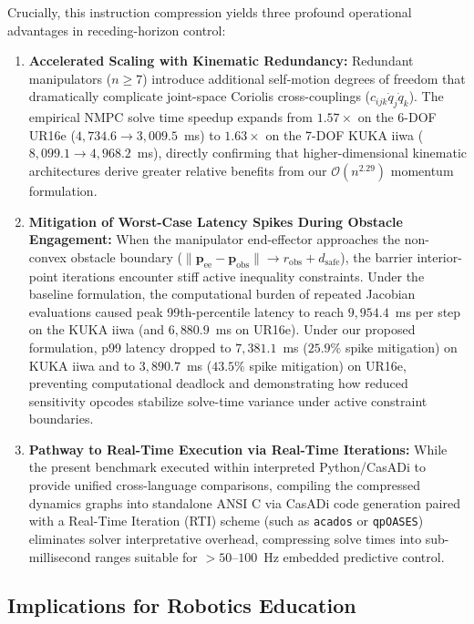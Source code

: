 \documentclass[fleqn,10pt]{article}
\begin{document}
Crucially, this instruction compression yields three profound operational advantages in receding-horizon control:
\begin{enumerate}
	\item \textbf{Accelerated Scaling with Kinematic Redundancy:} Redundant manipulators ($n \ge 7$) introduce additional self-motion degrees of freedom that dramatically complicate joint-space Coriolis cross-couplings ($c_{ijk}\dot{q}_j\dot{q}_k$). The empirical NMPC solve time speedup expands from $1.57\times$ on the 6-DOF UR16e ($4,734.6 \to 3,009.5$~ms) to $1.63\times$ on the 7-DOF KUKA iiwa ($8,099.1 \to 4,968.2$~ms), directly confirming that higher-dimensional kinematic architectures derive greater relative benefits from our $\mathcal{O}(n^{2.29})$ momentum formulation.
	\item \textbf{Mitigation of Worst-Case Latency Spikes During Obstacle Engagement:} When the manipulator end-effector approaches the non-convex obstacle boundary ($\|\bm{p}_{\text{ee}} - \bm{p}_{\text{obs}}\| \to r_{\text{obs}} + d_{\text{safe}}$), the barrier interior-point iterations encounter stiff active inequality constraints. Under the baseline formulation, the computational burden of repeated Jacobian evaluations caused peak 99th-percentile latency to reach $9,954.4$~ms per step on the KUKA iiwa (and $6,880.9$~ms on UR16e). Under our proposed formulation, p99 latency dropped to $7,381.1$~ms ($25.9\%$ spike mitigation) on KUKA iiwa and to $3,890.7$~ms ($43.5\%$ spike mitigation) on UR16e, preventing computational deadlock and demonstrating how reduced sensitivity opcodes stabilize solve-time variance under active constraint boundaries.
	\item \textbf{Pathway to Real-Time Execution via Real-Time Iterations:} While the present benchmark executed within interpreted Python/CasADi to provide unified cross-language comparisons, compiling the compressed dynamics graphs into standalone ANSI C via CasADi code generation paired with a Real-Time Iteration (RTI) scheme (such as \texttt{acados} or \texttt{qpOASES}) eliminates solver interpretative overhead, compressing solve times into sub-millisecond ranges suitable for $>50$--$100$~Hz embedded predictive control.
\end{enumerate}

\subsection{Implications for Robotics Education} \label{subsec:robotics_education}
\end{document}
